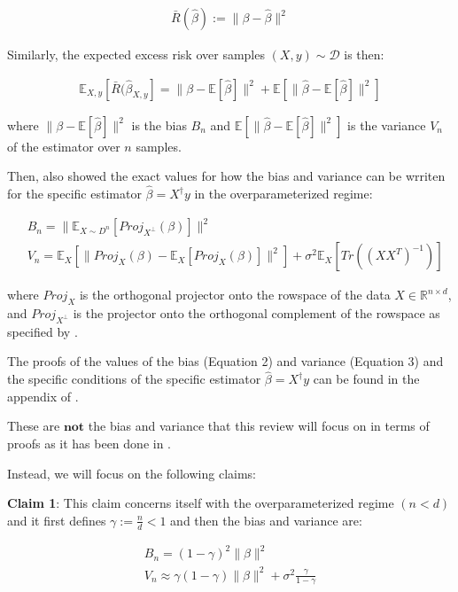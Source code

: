 \documentclass{article}
\begin{document}
\begin{align*}
    \bar{R}(\hat{\beta}) := \|\beta - \hat{\beta}\|^2
\end{align*}

Similarly, the expected excess risk over samples $(X,y) \sim \mathcal{D}$ is then:

\begin{align}
    \mathbb{E}_{X,y} [\bar{R} (\hat{\beta}_{X,y}] = \|\beta - \mathbb{E}[\hat{\beta}]\|^2 + \mathbb{E} [\|\hat{\beta} - \mathbb{E} [\hat{\beta}]\|^2]
\end{align}

where $\|\beta - \mathbb{E}[\hat{\beta}]\|^2$ is the bias $B_n$ and $\mathbb{E} [\|\hat{\beta} - \mathbb{E} [\hat{\beta}]\|^2]$ is the variance $V_n$ of the estimator over $n$ samples.

Then, \cite{Nakkiran_2019} also showed the exact values for how the bias and variance can be wrriten for the specific estimator $\hat{\beta} = X^{\dagger}y$ in the overparameterized regime:

\begin{align}
    &B_n = \| \mathbb{E}_{X \sim D^n} [Proj_{X^{\perp}} (\beta)] \|^2\\
    &V_n = \mathbb{E}_X [\|Proj_{X} (\beta) - \mathbb{E}_X [Proj_X (\beta)]\|^2] + \sigma^2 \mathbb{E}_X [Tr((XX^T)^{-1})]
\end{align}

where $Proj_X$ is the orthogonal projector onto the rowspace of the data $X\in\mathbb{R}^{n \times d}$, and $Proj_{X^{\perp}}$ is the projector onto the orthogonal complement of the rowspace as specified by \cite{Nakkiran_2019}.

The proofs of the values of the bias (Equation 2) and variance (Equation 3) and the specific conditions of the specific estimator $\hat{\beta} = X^{\dagger}y$ can be found in the appendix of \cite{Nakkiran_2019}.

These are $\textbf{not}$ the bias and variance that this review will focus on in terms of proofs as it has been done in \cite{Nakkiran_2019}.

\newpage

Instead, we will focus on the following claims:

\textbf{Claim 1}: This claim concerns itself with the overparameterized regime $(n < d)$ and it first defines $\gamma := \frac{n}{d} < 1$ and then the bias and variance are:

\begin{align}
    B_n = (1-\gamma)^2 \|\beta\|^2 \\
    V_n \approx \gamma (1-\gamma) \|\beta\|^2 + \sigma^2 \frac{\gamma}{1-\gamma}
\end{align}
\end{document}
